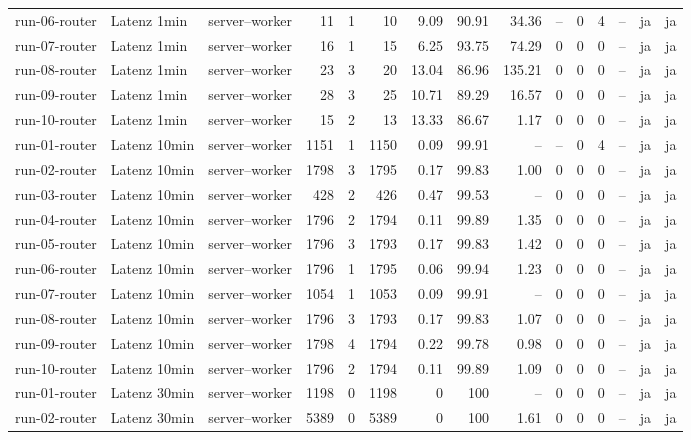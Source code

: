 \begin{table}
\begin{tabular}{l l p{3.2cm} r r r r r r r r r r r r}
run-06-router & Latenz 1min & server--worker & 11 & 1 & 10 & 9.09 & 90.91 & 34.36 & -- & 0 & 4 & -- & ja & ja \\
run-07-router & Latenz 1min & server--worker & 16 & 1 & 15 & 6.25 & 93.75 & 74.29 & 0 & 0 & 0 & -- & ja & ja \\
run-08-router & Latenz 1min & server--worker & 23 & 3 & 20 & 13.04 & 86.96 & 135.21 & 0 & 0 & 0 & -- & ja & ja \\
run-09-router & Latenz 1min & server--worker & 28 & 3 & 25 & 10.71 & 89.29 & 16.57 & 0 & 0 & 0 & -- & ja & ja \\
run-10-router & Latenz 1min & server--worker & 15 & 2 & 13 & 13.33 & 86.67 & 1.17 & 0 & 0 & 0 & -- & ja & ja \\
run-01-router & Latenz 10min & server--worker & 1151 & 1 & 1150 & 0.09 & 99.91 & -- & -- & 0 & 4 & -- & ja & ja \\
run-02-router & Latenz 10min & server--worker & 1798 & 3 & 1795 & 0.17 & 99.83 & 1.00 & 0 & 0 & 0 & -- & ja & ja \\
run-03-router & Latenz 10min & server--worker & 428 & 2 & 426 & 0.47 & 99.53 & -- & 0 & 0 & 0 & -- & ja & ja \\
run-04-router & Latenz 10min & server--worker & 1796 & 2 & 1794 & 0.11 & 99.89 & 1.35 & 0 & 0 & 0 & -- & ja & ja \\
run-05-router & Latenz 10min & server--worker & 1796 & 3 & 1793 & 0.17 & 99.83 & 1.42 & 0 & 0 & 0 & -- & ja & ja \\
run-06-router & Latenz 10min & server--worker & 1796 & 1 & 1795 & 0.06 & 99.94 & 1.23 & 0 & 0 & 0 & -- & ja & ja \\
run-07-router & Latenz 10min & server--worker & 1054 & 1 & 1053 & 0.09 & 99.91 & -- & 0 & 0 & 0 & -- & ja & ja \\
run-08-router & Latenz 10min & server--worker & 1796 & 3 & 1793 & 0.17 & 99.83 & 1.07 & 0 & 0 & 0 & -- & ja & ja \\
run-09-router & Latenz 10min & server--worker & 1798 & 4 & 1794 & 0.22 & 99.78 & 0.98 & 0 & 0 & 0 & -- & ja & ja \\
run-10-router & Latenz 10min & server--worker & 1796 & 2 & 1794 & 0.11 & 99.89 & 1.09 & 0 & 0 & 0 & -- & ja & ja \\
run-01-router & Latenz 30min & server--worker & 1198 & 0 & 1198 & 0 & 100 & -- & 0 & 0 & 0 & -- & ja & ja \\
run-02-router & Latenz 30min & server--worker & 5389 & 0 & 5389 & 0 & 100 & 1.61 & 0 & 0 & 0 & -- & ja & ja \\

\end{tabular}
\end{table}
